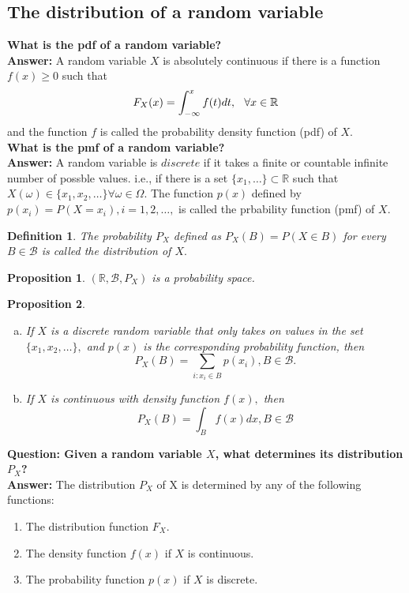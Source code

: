 \documentclass[12pt]{report} \addtolength{\textheight}{2in}
\newtheorem{defn}{Definition}
\newtheorem{prop}{Proposition}
\newcommand{\Borel}{\mathscr{B}}
\newcommand{\Realnum}{\mathbb{R}}
\begin{document}
\subsection*{The distribution of a random variable}
\textbf{What is the pdf of a random variable?}
\\
\textbf{Answer:} A random variable $X$ is absolutely continuous if there is a function $f(x)\geq 0$ such that
\begin{displaymath}
F_{X} (x) =\int_{-\infty}^{x} f(t) dt, \hspace{.1 in} \forall x \in \Realnum
\end{displaymath}
and the function $f$ is called the probability density function (pdf) of $X.$
\\
\textbf{What is the pmf of a random variable?}
\\
\textbf{Answer:} A random variable is $discrete$ if it takes a finite or countable infinite number of possble values. i.e., if there is a set $\{x_1,\dots\} \subset \Realnum$ such that $X(\omega) \in \{x_1,x_2,\dots\} \forall \omega \in \Omega.$ The function $p(x)$ defined by $p(x_i)=P(X=x_i), i=1,2,\dots,$ is called the prbability function (pmf) of $X.$
\\

\begin{defn}
The probability $P_X$ defined as $P_X(B)=P(X \in B)$ for every $B \in \Borel$ is called the distribution of $X.$
\end{defn}
\begin{prop}
$(\Realnum, \Borel, P_X)$ is a probability space.
\end{prop}
\begin{prop}
\begin{enumerate}[(a)]
\item If $X$ is a discrete random variable that only takes on values in the set $\{x_1,x_2,\dots\},$ and $p(x)$ is the corresponding probability function, then
\begin{displaymath}
P_X(B)=\sum_{i: x_i \in B} p(x_i),  B \in \Borel.
\end{displaymath}
\item If $X$ is continuous with density function $f(x),$ then
\begin{displaymath}
P_X(B)=\int_{B} f(x) dx, B \in \Borel
\end{displaymath}
\end{enumerate}
\end{prop}
\textbf{Question: Given a random variable $X$, what determines its distribution $P_X$?}\\
\textbf{Answer:} The distribution $P_X$ of X is determined by any of the following functions:
\begin{enumerate}[(1)]
\item The distribution function $F_X.$
\item The density function $f(x)$ if $X$ is continuous.
\item The probability function $p(x)$ if $X$ is discrete.
\end{enumerate}
\end{document}
